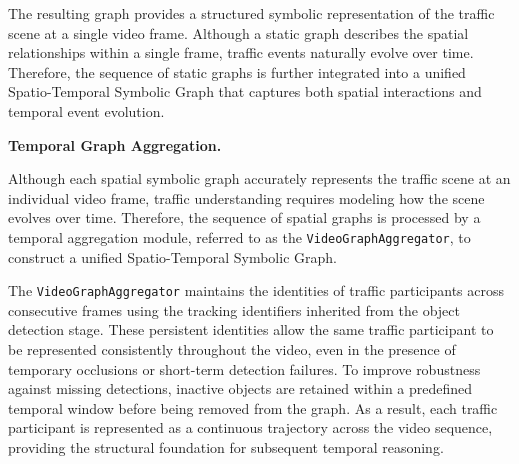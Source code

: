 \documentclass[a4paper, 11pt]{article} %
\begin{document}
The resulting graph provides a structured symbolic representation of the traffic scene at a single video frame.
Although a static graph describes the spatial relationships within a single frame, traffic events naturally evolve over time. Therefore, the sequence of static graphs is further integrated into a unified Spatio-Temporal Symbolic Graph that captures both spatial interactions and temporal event evolution.

\textbf{Temporal Graph Aggregation.}

Although each spatial symbolic graph accurately represents the traffic scene at an individual video frame, traffic understanding requires modeling how the scene evolves over time. Therefore, the sequence of spatial graphs is processed by a temporal aggregation module, referred to as the \texttt{VideoGraphAggregator}, to construct a unified Spatio-Temporal Symbolic Graph.

The \texttt{VideoGraphAggregator} maintains the identities of traffic participants across consecutive frames using the tracking identifiers inherited from the object detection stage. These persistent identities allow the same traffic participant to be represented consistently throughout the video, even in the presence of temporary occlusions or short-term detection failures. To improve robustness against missing detections, inactive objects are retained within a predefined temporal window before being removed from the graph. As a result, each traffic participant is represented as a continuous trajectory across the video sequence, providing the structural foundation for subsequent temporal reasoning.
\end{document}
